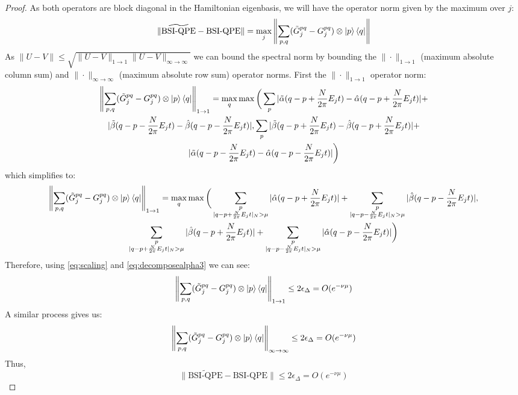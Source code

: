 \documentclass[aps,floatfix,10pt,amssymb,amsfont,amsmath,superscriptaddress,float,nofootinbib,longbibliography,nobalancelastpage,twocolumn]{revtex4-2}
\begin{document}
\begin{proof}
    As both operators are block diagonal in the Hamiltonian eigenbasis, we will have the operator norm given by the maximum over $j$:
    \begin{equation}
        \|\widetilde{\text{BSI-QPE}}-\text{BSI-QPE}\| = \max_j 
        \left\|\sum_{p,q}(\tilde G^{pq}_j - G^{pq}_j) \otimes \ket{p}\bra{q}\right\|
    \end{equation}
    As $\|U-V\| \leq \sqrt{\|U-V\|_{1\to1}\|U-V\|_{\infty\to\infty}}$ we can bound the spectral norm by bounding the $\|\cdot\|_{1\to1}$ (maximum absolute column sum) and $\|\cdot\|_{\infty\to\infty}$ (maximum absolute row sum) operator norms. First the $\|\cdot\|_{1\to1}$  operator norm:
    \begin{multline}
         \left\|\sum_{p,q}(\tilde G^{pq}_j - G^{pq}_j) \otimes \ket{p}\bra{q}\right\|_{1\to1} = \max_q \max\bigg(\sum_{p}|\tilde\alpha(q-p+\frac{N}{2\pi}E_jt)-\hat\alpha(q-p+\frac{N}{2\pi}E_jt)|+\\|\tilde\beta (q-p-\frac{N}{2\pi}E_jt)-\hat\beta (q-p-\frac{N}{2\pi}E_jt)|, \sum_{p}|\tilde\beta(q-p+\frac{N}{2\pi}E_jt)-\hat\beta(q-p+\frac{N}{2\pi}E_jt)|+\\|\tilde\alpha (q-p-\frac{N}{2\pi}E_jt)-\hat\alpha (q-p-\frac{N}{2\pi}E_jt)|\bigg)
    \end{multline}
    which simplifies to:
    \begin{multline}
         \left\|\sum_{p,q}(\tilde G^{pq}_j - G^{pq}_j) \otimes \ket{p}\bra{q}\right\|_{1\to1} = \max_q\max\bigg(\sum_{\substack{p\\|q-p+\frac{N}{2\pi}E_jt|_{N}>\mu}}|\hat\alpha(q-p+\frac{N}{2\pi}E_jt)|+\sum_{\substack{p\\|q-p-\frac{N}{2\pi}E_jt|_{N}>\mu}}|\hat\beta (q-p-\frac{N}{2\pi}E_jt)|,\\
         \sum_{\substack{p\\|q-p+\frac{N}{2\pi}E_jt|_{N}>\mu}}|\hat\beta(q-p+\frac{N}{2\pi}E_jt)|+\sum_{\substack{p\\|q-p-\frac{N}{2\pi}E_jt|_{N}>\mu}}|\hat\alpha (q-p-\frac{N}{2\pi}E_jt)|\bigg)
    \end{multline}
    Therefore, using \eqref{eq:scaling} and \eqref{eq:decomposealpha3}  we can see:
    \begin{equation}
        \left\|\sum_{p,q}(\tilde G^{pq}_j - G^{pq}_j) \otimes \ket{p}\bra{q}\right\|_{1\to1} \leq 2\epsilon_{\Delta} = O(e^{-\nu \mu})
    \end{equation}
    A similar process gives us:
    \begin{equation}
        \left\|\sum_{p,q}(\tilde G^{pq}_j - G^{pq}_j) \otimes \ket{p}\bra{q}\right\|_{\infty\to\infty} \leq 2\epsilon_{\Delta} =O(e^{-\nu \mu})
    \end{equation}
    Thus,
    \begin{equation}
        \|\widetilde{\text{BSI-QPE}}-\text{BSI-QPE}\| \leq 2\epsilon_{\Delta} = O\left(e^{-\nu \mu}\right)
    \end{equation}
\end{proof}
\end{document}
